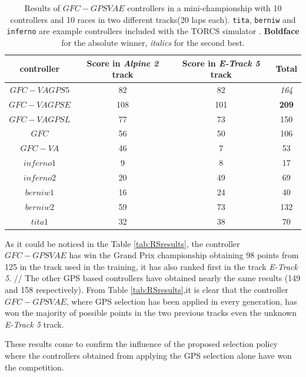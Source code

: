 \documentclass[10pt,journal,compsoc]{IEEEtran}
\begin{document}
%
\begin{table}[ht]
	\centering
	{\scriptsize
		\caption{ Results of $GFC-GPSVAE$ controllers in a mini-championship with 10 controllers and 10
			races in two different tracks(20 laps each). {\tt tita}, {\tt berniw} and {\tt
				inferno} are example controllers included with the TORCS
			simulator \cite{torcs4}. {\bf Boldface}
                      for the absolute winner, {\em italics} for the second
                    best.}
		{
			\begin{tabular}{|c|c|c||c|}
				\hline
				controller&Score in \textit{Alpine 2} track &Score in \textit{E-Track 5} track &Total\\
				\hline
				\hline	
				$GFC-VAGPS5$ \cite{DBLP:conf/cig/SalemMG19}&	82&	82&	{\em 164}\\
				$GFC-VAGPSE$&	108&    101&	{\bf 209}\\
				$GFC-VAGPSL$\cite{DBLP:conf/cig/SalemMG19}&	77&	73&	150\\
				$GFC$  \cite{salem_cig2018}&	56&	50&	106\\
				$GFC-VA$ \cite{DBLP:conf/cig/SalemMG19}&	46&	7&	53\\
				$inferno1$&	9&	8&	17\\
				$inferno2$&	20&	49&	69\\
				$berniw1$&	16&	24&	40\\
				$berniw2$&	59&	73&	132\\
				$tita1$&	32&	38&	70\\			
				\hline
				
			\end{tabular}
		}\label{tab:VaryingalphaRSresults}
	}
\end{table}
%
As it could be noticed in the Table \ref{tab:RSresults}, the controller $GFC-GPSVAE$ has win the Grand Prix championship obtaining 98 points from 125 in the track used in the training, it has also ranked first in the track  \textit{E-Track 5}. //
The other GPS based controllers have obtained nearly the same results (149 and 158 respectively).
From Table \ref{tab:RSresults},it is clear that the controller $GFC-GPSVAE$, where GPS selection has been applied in every generation, has won the majority of possible points in the two previous tracks even the unknown \textit{E-Track 5}  track.

These results come to confirm the influence of the proposed selection policy where the controllers obtained from applying the GPS selection alone have won the competition.
 
\end{document}
